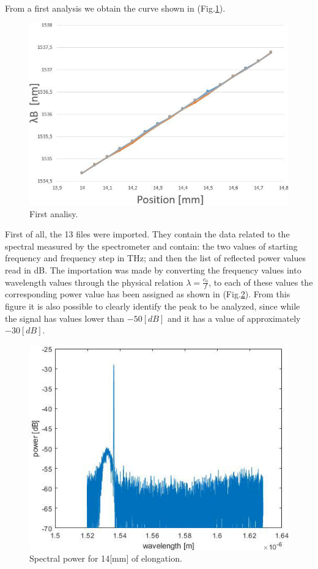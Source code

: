 From a first analysis we obtain the curve shown in (Fig.\ref{fig:firstAnalisy}).
\begin{figure}[h]
    \centering
    \includegraphics[scale=0.7]{img/firstAnalisy.jpg}
    \caption{First analisy.}
    \label{fig:firstAnalisy}
\end{figure}


\newpage
{}
First of all, the 13 files were imported. They contain the data related to the spectral measured by the spectrometer and contain: the two values of starting frequency and frequency step in THz; and then the list of reflected power values read in dB. The importation was made by converting the frequency values into wavelength values through the physical relation $\lambda = \frac{c_0}{f}$, to each of these values the corresponding power value has been assigned as shown in (Fig.\ref{fig:spectralPower}). From this figure it is also possible to clearly identify the peak to be analyzed, since while the signal has values lower than $-50[dB]$ and it has a value of approximately $-30[dB]$.
\begin{figure}[h]
    \centering
    \includegraphics[scale=0.7]{img/spectralPower.jpg}
    \caption{Spectral power for 14[mm] of elongation.}
    \label{fig:spectralPower}
\end{figure}

